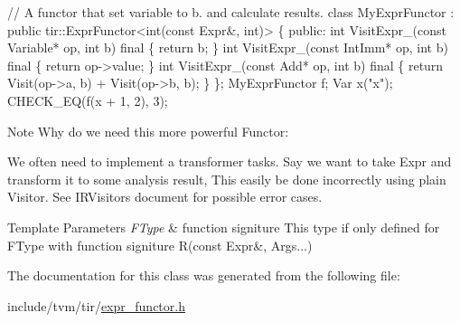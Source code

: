 \begin{DoxyCode}
\textcolor{comment}{// A functor that set variable to b. and calculate results.}
\textcolor{keyword}{class }MyExprFunctor
  : \textcolor{keyword}{public} tir::ExprFunctor<int(const Expr&, int)> \{
 \textcolor{keyword}{public}:
  \textcolor{keywordtype}{int} VisitExpr\_(\textcolor{keyword}{const} Variable* op, \textcolor{keywordtype}{int} b) \textcolor{keyword}{final} \{
   \textcolor{keywordflow}{return} b;
  \}
  \textcolor{keywordtype}{int} VisitExpr\_(\textcolor{keyword}{const} IntImm* op, \textcolor{keywordtype}{int} b) \textcolor{keyword}{final} \{
    \textcolor{keywordflow}{return} op->value;
  \}
  \textcolor{keywordtype}{int} VisitExpr\_(\textcolor{keyword}{const} Add* op, \textcolor{keywordtype}{int} b) \textcolor{keyword}{final} \{
   \textcolor{keywordflow}{return} Visit(op->a, b) + Visit(op->b, b);
  \}
\};
MyExprFunctor f;
Var x(\textcolor{stringliteral}{"x"});
CHECK\_EQ(f(x + 1, 2), 3);
\end{DoxyCode}


\begin{DoxyNote}{Note}
Why do we need this more powerful Functor\+:
\end{DoxyNote}
We often need to implement a transformer tasks. Say we want to take Expr and transform it to some analysis result, This easily be done incorrectly using plain Visitor. See I\+R\+Visitor\textquotesingle{}s document for possible error cases.


\begin{DoxyTemplParams}{Template Parameters}
{\em F\+Type} & function signiture This type if only defined for F\+Type with function signiture R(const Expr\&, Args...) \\
\hline
\end{DoxyTemplParams}


The documentation for this class was generated from the following file\+:\begin{DoxyCompactItemize}
\item 
include/tvm/tir/\hyperlink{tir_2expr__functor_8h}{expr\+\_\+functor.\+h}\end{DoxyCompactItemize}
